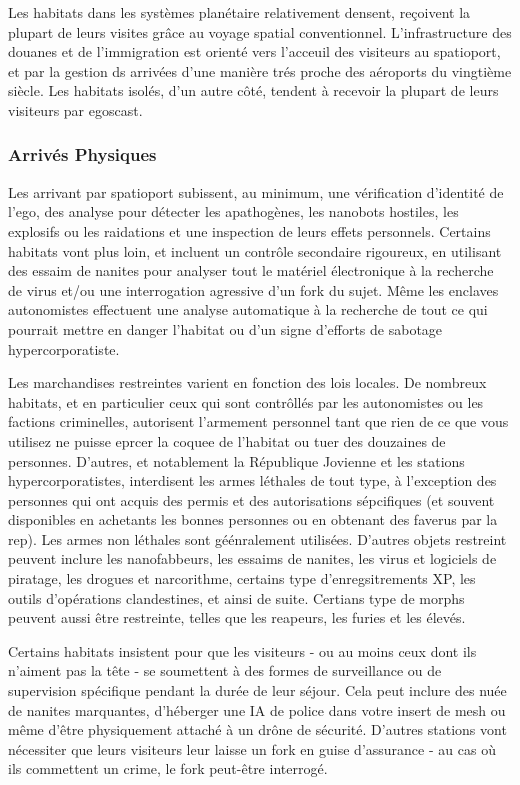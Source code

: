 Les habitats dans les systèmes planétaire relativement densent, reçoivent la plupart de leurs visites grâce au voyage spatial conventionnel. L'infrastructure des douanes et de l'immigration est orienté vers l'acceuil des visiteurs au spatioport, et par la gestion ds arrivées d'une manière trés proche des aéroports du vingtième siècle. Les habitats isolés, d'un autre côté, tendent à recevoir la plupart de leurs visiteurs par egoscast. 

\subsubsection{Arrivés Physiques} 

Les arrivant par spatioport subissent, au minimum, une vérification d'identité de l'ego, des analyse pour détecter les apathogènes, les nanobots hostiles, les explosifs ou les raidations et une inspection de leurs effets personnels. Certains habitats vont plus loin, et incluent un contrôle secondaire rigoureux, en utilisant des essaim de nanites pour analyser tout le matériel électronique à la recherche de virus et/ou une interrogation agressive d'un fork du sujet. Même les enclaves autonomistes effectuent une analyse automatique à la recherche de tout ce qui pourrait mettre en danger l'habitat ou d'un signe d'efforts de sabotage hypercorporatiste. 

Les marchandises restreintes varient en fonction des lois locales. De nombreux habitats, et en particulier ceux qui sont contrôllés par les autonomistes ou les factions criminelles, autorisent l'armement personnel tant que rien de ce que vous utilisez ne puisse eprcer la coquee de l'habitat ou tuer des douzaines de personnes. D'autres, et notablement la République Jovienne et les stations hypercorporatistes, interdisent les armes léthales de tout type, à l'exception des personnes qui ont acquis des permis et des autorisations sépcifiques (et souvent disponibles en achetants les bonnes personnes ou en obtenant des faverus par la rep). Les armes non léthales sont géénralement utilisées. D'autres objets restreint peuvent inclure les nanofabbeurs, les essaims de nanites, les virus et logiciels de piratage, les drogues et narcorithme, certains type d'enregsitrements XP, les outils d'opérations clandestines, et ainsi de suite. Certians type de morphs peuvent aussi être restreinte, telles que les reapeurs, les furies et les élevés. 

Certains habitats insistent pour que les visiteurs - ou au moins ceux dont ils n'aiment pas la tête - se soumettent à des formes de surveillance ou de supervision spécifique pendant la durée de leur séjour. Cela peut inclure des nuée de nanites marquantes, d'héberger une IA de police dans votre insert de mesh ou même d'être physiquement attaché à un drône de sécurité. D'autres stations vont nécessiter que leurs visiteurs leur laisse un fork en guise d'assurance - au cas où ils commettent un crime, le fork peut-être interrogé. 



